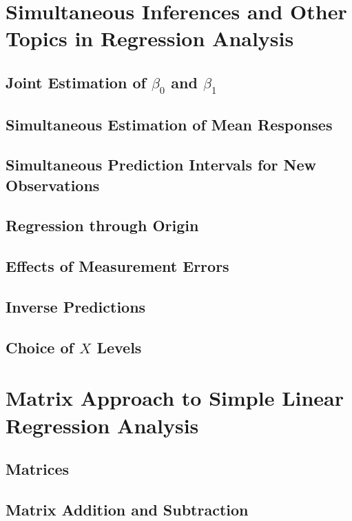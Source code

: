 \section{Simultaneous Inferences and Other Topics in Regression Analysis}
\subsection{Joint Estimation of $\beta_0$ and $\beta_1$}

\subsection{Simultaneous Estimation of Mean Responses}

\subsection{Simultaneous Prediction Intervals for New Observations}

\subsection{Regression through Origin}

\subsection{Effects of Measurement Errors}

\subsection{Inverse Predictions}

\subsection{Choice of $X$ Levels}


\section{Matrix Approach to Simple Linear Regression Analysis}
\subsection{Matrices}

\subsection{Matrix Addition and Subtraction}

